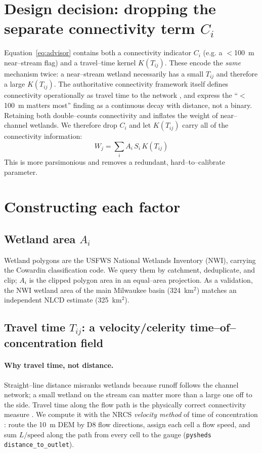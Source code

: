 \documentclass[11pt]{article}
\newcommand{\Wj}{W_{j}}
\newcommand{\Ti}{T_{ij}}
\begin{document}
\section{Design decision: dropping the separate connectivity term $C_i$}
Equation~\eqref{eq:advisor} contains both a connectivity indicator $C_i$ (e.g. a $<$100~m
near--stream flag) and a travel--time kernel $K(\Ti)$. These encode the \emph{same} mechanism
twice: a near--stream wetland necessarily has a small $\Ti$ and therefore a large $K(\Ti)$. The
authoritative connectivity framework itself defines connectivity operationally as travel time to
the network \citep{lane2018}, and \citet{ameli2019} express the ``$<$100~m matters most'' finding
as a continuous decay with distance, not a binary. Retaining both double--counts connectivity and
inflates the weight of near--channel wetlands. We therefore drop $C_i$ and let $K(\Ti)$ carry all
of the connectivity information:
\begin{equation}
\boxed{\;\Wj=\sum_i A_i\,S_i\,K(\Ti)\;}
\label{eq:W}
\end{equation}
This is more parsimonious and removes a redundant, hard--to--calibrate parameter.

\section{Constructing each factor}

\subsection{Wetland area $A_i$}
Wetland polygons are the USFWS National Wetlands Inventory (NWI), carrying the Cowardin
classification code. We query them by catchment, deduplicate, and clip; $A_i$ is the clipped
polygon area in an equal--area projection. As a validation, the NWI wetland area of the main
Milwaukee basin (324~km$^2$) matches an independent NLCD estimate (325~km$^2$).

\subsection{Travel time $\Ti$: a velocity/celerity time--of--concentration field}
\paragraph{Why travel time, not distance.} Straight--line distance misranks wetlands because
runoff follows the channel network; a small wetland on the stream can matter more than a large one
off to the side. Travel time along the flow path is the physically correct connectivity measure
\citep{lane2018}. We compute it with the NRCS \emph{velocity method} of time of concentration
\citep{tr55,mccuen}: route the 10~m DEM by D8 flow directions, assign each cell a flow speed, and
sum $L/\text{speed}$ along the path from every cell to the gauge (\texttt{pysheds}
\texttt{distance\_to\_outlet}).
\end{document}
